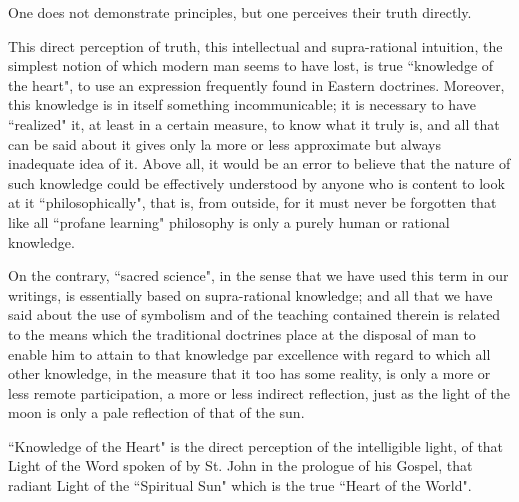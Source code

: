 \begin{quotex}
One does not demonstrate principles, but one perceives their truth directly. 

\end{quotex}
This direct perception of truth, this intellectual and supra-rational intuition, the simplest notion of which modern man seems to have lost, is true ``knowledge of the heart", to use an expression frequently found in Eastern doctrines. Moreover, this knowledge is in itself something incommunicable; it is necessary to have ``realized" it, at least in a certain measure, to know what it truly is, and all that can be said about it gives only la more or less approximate but always inadequate idea of it. Above all, it would be an error to believe that the nature of such knowledge could be effectively understood by anyone who is content to look at it ``philosophically", that is, from outside, for it must never be forgotten that like all ``profane learning" philosophy is only a purely human or rational knowledge.

On the contrary, ``sacred science", in the sense that we have used this term in our writings, is essentially based on supra-rational knowledge; and all that we have said about the use of symbolism and of the teaching contained therein is related to the means which the traditional doctrines place at the disposal of man to enable him to attain to that knowledge par excellence with regard to which all other knowledge, in the measure that it too has some reality, is only a more or less remote participation, a more or less indirect reflection, just as the light of the moon is only a pale reflection of that of the sun.

``Knowledge of the Heart" is the direct perception of the intelligible light, of that Light of the Word spoken of by St. John in the prologue of his Gospel, that radiant Light of the ``Spiritual Sun" which is the true ``Heart of the World".



